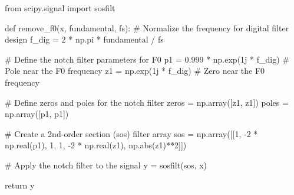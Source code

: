 \documentclass[
  letterpaper,
  DIV=11,
  numbers=noendperiod]{scrreprt}
\newenvironment{Shaded}{\begin{snugshade}}{\end{snugshade}}
\newcommand{\BuiltInTok}[1]{\textcolor[rgb]{0.00,0.23,0.31}{#1}}
\newcommand{\CommentTok}[1]{\textcolor[rgb]{0.37,0.37,0.37}{#1}}
\newcommand{\ControlFlowTok}[1]{\textcolor[rgb]{0.00,0.23,0.31}{#1}}
\newcommand{\DecValTok}[1]{\textcolor[rgb]{0.68,0.00,0.00}{#1}}
\newcommand{\FloatTok}[1]{\textcolor[rgb]{0.68,0.00,0.00}{#1}}
\newcommand{\ImportTok}[1]{\textcolor[rgb]{0.00,0.46,0.62}{#1}}
\newcommand{\KeywordTok}[1]{\textcolor[rgb]{0.00,0.23,0.31}{#1}}
\newcommand{\NormalTok}[1]{\textcolor[rgb]{0.00,0.23,0.31}{#1}}
\newcommand{\OperatorTok}[1]{\textcolor[rgb]{0.37,0.37,0.37}{#1}}
\newcommand{\OtherTok}[1]{\textcolor[rgb]{0.00,0.23,0.31}{#1}}
\begin{document}
\begin{Shaded}
\begin{Highlighting}[]
\ImportTok{from}\NormalTok{ scipy.signal }\ImportTok{import}\NormalTok{ sosfilt}

\KeywordTok{def}\NormalTok{ remove\_f0(x, fundamental, fs):}
    \CommentTok{\# Normalize the frequency for digital filter design}
\NormalTok{    f\_dig }\OperatorTok{=} \DecValTok{2} \OperatorTok{*}\NormalTok{ np.pi }\OperatorTok{*}\NormalTok{ fundamental }\OperatorTok{/}\NormalTok{ fs}
    
    \CommentTok{\# Define the notch filter parameters for F0}
\NormalTok{    p1 }\OperatorTok{=} \FloatTok{0.999} \OperatorTok{*}\NormalTok{ np.exp(}\OtherTok{1j} \OperatorTok{*}\NormalTok{ f\_dig)  }\CommentTok{\# Pole near the F0 frequency}
\NormalTok{    z1 }\OperatorTok{=}\NormalTok{ np.exp(}\OtherTok{1j} \OperatorTok{*}\NormalTok{ f\_dig)          }\CommentTok{\# Zero near the F0 frequency}
    
    \CommentTok{\# Define zeros and poles for the notch filter}
\NormalTok{    zeros }\OperatorTok{=}\NormalTok{ np.array([z1, z1])}
\NormalTok{    poles }\OperatorTok{=}\NormalTok{ np.array([p1, p1])}
    
    \CommentTok{\# Create a 2nd{-}order section (sos) filter array}
\NormalTok{    sos }\OperatorTok{=}\NormalTok{ np.array([[}\DecValTok{1}\NormalTok{, }\OperatorTok{{-}}\DecValTok{2} \OperatorTok{*}\NormalTok{ np.real(p1), }\DecValTok{1}\NormalTok{, }\DecValTok{1}\NormalTok{, }\OperatorTok{{-}}\DecValTok{2} \OperatorTok{*}\NormalTok{ np.real(z1), np.}\BuiltInTok{abs}\NormalTok{(z1)}\OperatorTok{**}\DecValTok{2}\NormalTok{]])}

    \CommentTok{\# Apply the notch filter to the signal}
\NormalTok{    y }\OperatorTok{=}\NormalTok{ sosfilt(sos, x)}
    
    \ControlFlowTok{return}\NormalTok{ y}
\end{Highlighting}
\end{Shaded}
\end{document}
